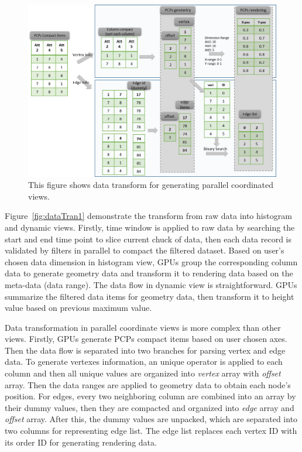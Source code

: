 \documentclass[journal]{vgtc}                %
\begin{document}
{\begin{figure}[htb]
	\centering
	\includegraphics[width=1.0\linewidth]{pic/dataTran2.png}
	\parbox[t]{1.0\columnwidth}{\relax
	}
	\caption{\label{fig:dataTran2} This figure shows data transform for generating parallel coordinated views.}
\end{figure} 

Figure~\ref{fig:dataTran1} demonstrate the transform from raw data into histogram and dynamic views. Firstly, time window is applied to raw data by searching the start and end time point to slice current chuck of data, then each data record is validated by filters in parallel to compact the filtered dataset. Based on user's chosen data dimension in histogram view,  GPUs group the corresponding column data to generate geometry data and transform it to rendering data based on the meta-data (data range). The data flow in dynamic view is straightforward. GPUs summarize the filtered data items for geometry data, then transform it to height value based on previous maximum value.

Data transformation in parallel coordinate views is more complex than other views. Firstly, GPUs generate PCPs compact items based on user chosen axes. Then the data flow is separated into two branches for parsing vertex and edge data. To generate vertexes information, an unique operator is applied to each column and then all unique values are organized into \textit{vertex} array with \textit{offset} array. Then the data ranges are applied to geometry data to obtain each node's position.
For edges, every two neighboring column are combined into an array by their dummy values, then they are compacted and organized into \textit{edge} array and \textit{offset} array.  After this, the dummy values are unpacked, which are separated into two columns for representing edge list. The edge list replaces each vertex ID with its order ID for generating rendering data.  


}
\end{document}
